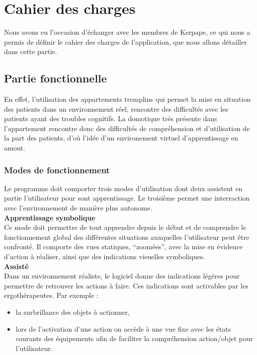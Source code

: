 \section{Cahier des charges}

Nous avons eu l'occasion d'échanger avec les membres de Kerpape, ce qui nous a permis de définir le cahier des charges de l'application, que nous allons détailler dans cette partie.

\subsection{Partie fonctionnelle}

En effet, l'utilisation des appartements tremplins qui permet la mise en situation des patients dans un environnement réel, rencontre des difficultés avec les patients ayant des troubles cognitifs. La domotique trés présente dans l'appartement rencontre donc des difficultés de compréhension et d'utilisation de la part des patients, d'où l'idée d'un environement virtuel d'apprentissage en amont.

\subsubsection{Modes de fonctionnement}

Le programme doit comporter trois modes d'utilisation dont deux assistent en partie l'utilisateur pour sont apprentissage. Le troisième permet une interraction avec l'environnement de manière plus autonome.\\

\textbf{Apprentissage symbolique}
\\

Ce mode doit permettre de tout apprendre depuis le début et de comprendre le fonctionnement global des différentes situations auxquelles l'utilisateur peut être confronté. Il comporte des vues statiques, \enquote{zoomées}, avec la mise en évidence d'action à réaliser, ainsi que des indications visuelles symboliques.\\

\textbf{Assisté}
\\

Dans un environnement réaliste, le logiciel donne des indications légères pour permettre de retrouver les actions à faire. Ces indications sont activables par les ergothérapeutes. Par exemple :
\begin{itemize}
  \item la surbrillance des objets à actionner,
  \item lors de l'activation d'une action on accède à une vue fixe avec les états courants des équipements afin de faciliter la compréhension action/objet pour l'utilisateur. \\
\end{itemize}

